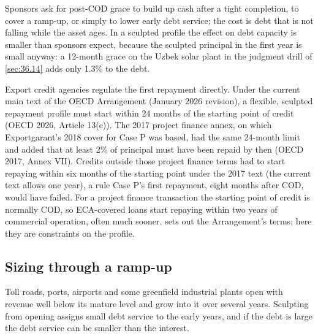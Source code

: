 Sponsors ask for post-COD grace to build up cash after a tight completion, to cover a ramp-up, or simply to lower early debt service; the cost is debt that is not falling while the asset ages. In a sculpted profile the effect on debt capacity is smaller than sponsors expect, because the sculpted principal in the first year is small anyway: a 12-month grace on the Uzbek solar plant in the judgment drill of \cref{sec:36.14} adds only 1.3\% to the debt.

Export credit agencies regulate the first repayment directly. Under the current main text of the OECD Arrangement (January 2026 revision), a flexible, sculpted repayment profile must start within 24 months of the starting point of credit (OECD 2026, Article 13(e)). The 2017 project finance annex, on which Exportgarant's 2018 cover for Case P was based, had the same 24-month limit and added that at least 2\% of principal must have been repaid by then (OECD 2017, Annex VII). Credits outside those project finance terms had to start repaying within six months of the starting point under the 2017 text (the current text allows one year), a rule Case P's first repayment, eight months after COD, would have failed. For a project finance transaction the starting point of credit is normally COD, so ECA-covered loans start repaying within two years of commercial operation, often much sooner.  sets out the Arrangement's terms; here they are constraints on the profile.

\subsection{Sizing through a ramp-up}\label{ssec:36.6.2}

Toll roads, ports, airports and some greenfield industrial plants open with revenue well below its mature level and grow into it over several years. Sculpting from opening assigns small debt service to the early years, and if the debt is large the debt service can be smaller than the interest.

